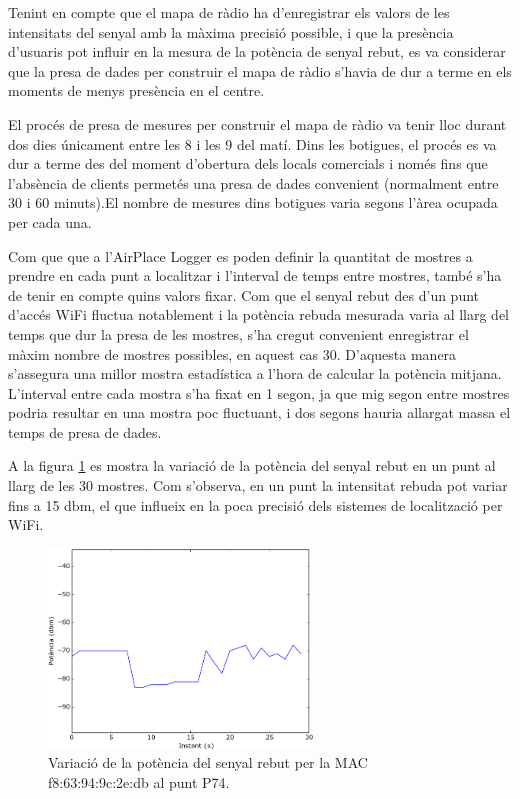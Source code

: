 Tenint en compte que el mapa de ràdio ha d'enregistrar els valors de les intensitats del senyal amb la màxima precisió possible, i que la presència d'usuaris pot influir en la mesura de la potència de senyal rebut, es va considerar que la presa de dades per construir el mapa de ràdio s'havia de dur a terme en els moments de menys presència en el centre.

El procés de presa de mesures per construir el mapa de ràdio va tenir lloc durant dos dies únicament entre les 8 i les 9 del matí. Dins les botigues, el procés es va dur a terme des del moment d'obertura dels locals comercials i només fins que l'absència de clients permetés una presa de dades convenient (normalment entre 30 i 60 minuts).El nombre de mesures dins botigues varia segons l'àrea ocupada per cada una.

Com que que a l'AirPlace Logger es poden definir la quantitat de mostres a prendre en cada punt a localitzar i l'interval de temps entre mostres, també s'ha de tenir en compte quins valors fixar. Com que el senyal rebut des d'un punt d'accés WiFi fluctua notablement i la potència rebuda mesurada varia al llarg del temps que dur la presa de les mostres, s'ha cregut convenient enregistrar el màxim nombre de mostres possibles, en aquest cas 30. D'aquesta manera s'assegura una millor mostra estadística a l'hora de calcular la potència mitjana. L'interval entre cada mostra s'ha fixat en 1 segon, ja que mig segon entre mostres podria resultar en una mostra poc fluctuant, i dos segons hauria allargat massa el temps de presa de dades.

A la figura \ref{fig:fluctuacio} es mostra la variació de la potència del senyal rebut en un punt al llarg de les 30 mostres. Com s'observa, en un punt la intensitat rebuda pot variar fins a 15 dbm, el que influeix en la poca precisió dels sistemes de localització per WiFi.

\begin{figure}[ht]
\begin{center}
\includegraphics[width=7cm]{imatges/fluctuacio.png}
\caption{Variació de la potència del senyal rebut per la MAC f8:63:94:9c:2e:db al punt P74.}
\label{fig:fluctuacio}
\end{center}
\end{figure}
